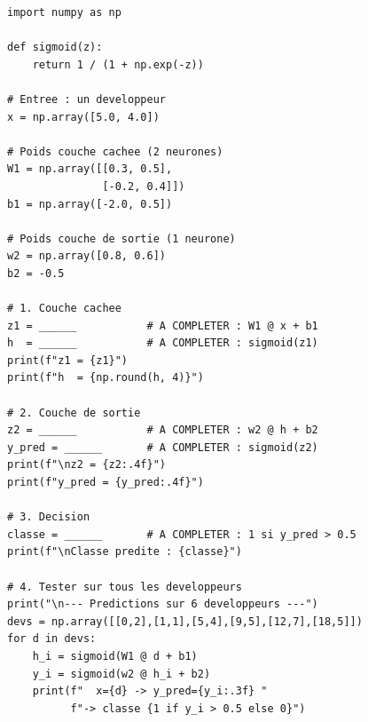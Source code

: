 \begin{pythonbox}
\begin{lstlisting}
import numpy as np

def sigmoid(z):
    return 1 / (1 + np.exp(-z))

# Entree : un developpeur
x = np.array([5.0, 4.0])

# Poids couche cachee (2 neurones)
W1 = np.array([[0.3, 0.5],
               [-0.2, 0.4]])
b1 = np.array([-2.0, 0.5])

# Poids couche de sortie (1 neurone)
w2 = np.array([0.8, 0.6])
b2 = -0.5

# 1. Couche cachee
z1 = ______           # A COMPLETER : W1 @ x + b1
h  = ______           # A COMPLETER : sigmoid(z1)
print(f"z1 = {z1}")
print(f"h  = {np.round(h, 4)}")

# 2. Couche de sortie
z2 = ______           # A COMPLETER : w2 @ h + b2
y_pred = ______       # A COMPLETER : sigmoid(z2)
print(f"\nz2 = {z2:.4f}")
print(f"y_pred = {y_pred:.4f}")

# 3. Decision
classe = ______       # A COMPLETER : 1 si y_pred > 0.5
print(f"\nClasse predite : {classe}")

# 4. Tester sur tous les developpeurs
print("\n--- Predictions sur 6 developpeurs ---")
devs = np.array([[0,2],[1,1],[5,4],[9,5],[12,7],[18,5]])
for d in devs:
    h_i = sigmoid(W1 @ d + b1)
    y_i = sigmoid(w2 @ h_i + b2)
    print(f"  x={d} -> y_pred={y_i:.3f} "
          f"-> classe {1 if y_i > 0.5 else 0}")
\end{lstlisting}
\end{pythonbox}


